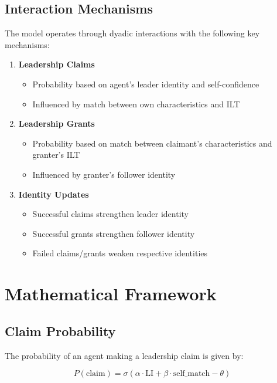 \documentclass[12pt]{article}
\begin{document}
\subsection{Interaction Mechanisms}
The model operates through dyadic interactions with the following key mechanisms:

\begin{enumerate}
    \item \textbf{Leadership Claims}
    \begin{itemize}
        \item Probability based on agent's leader identity and self-confidence
        \item Influenced by match between own characteristics and ILT
    \end{itemize}
    
    \item \textbf{Leadership Grants}
    \begin{itemize}
        \item Probability based on match between claimant's characteristics and granter's ILT
        \item Influenced by granter's follower identity
    \end{itemize}
    
    \item \textbf{Identity Updates}
    \begin{itemize}
        \item Successful claims strengthen leader identity
        \item Successful grants strengthen follower identity
        \item Failed claims/grants weaken respective identities
    \end{itemize}
\end{enumerate}

\section{Mathematical Framework}

\subsection{Claim Probability}
The probability of an agent making a leadership claim is given by:

\begin{equation}
P(\text{claim}) = \sigma(\alpha \cdot \text{LI} + \beta \cdot \text{self\_match} - \theta)
\end{equation}
\end{document}
